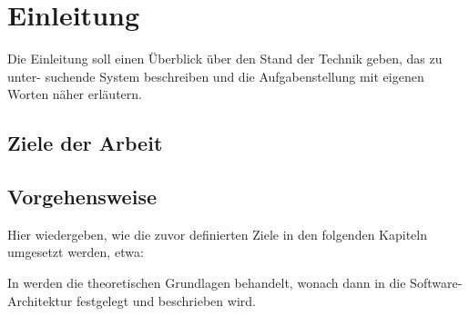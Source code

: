 \chapter{Einleitung}

Die Einleitung soll einen Überblick über den Stand der Technik geben, das zu unter-
suchende System beschreiben und die Aufgabenstellung mit eigenen Worten näher
erläutern.

\section{Ziele der Arbeit}

\section{Vorgehensweise}

Hier wiedergeben, wie die zuvor definierten Ziele in den folgenden Kapiteln umgesetzt werden, etwa:

In  werden die theoretischen Grundlagen behandelt, wonach dann in  die Software-Architektur festgelegt und 
beschrieben wird.